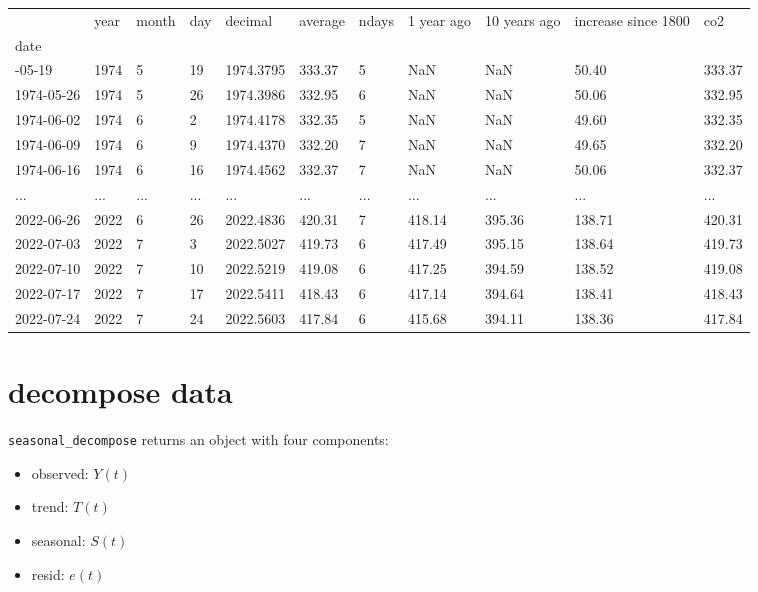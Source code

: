 \documentclass[
  letterpaper,
  DIV=11,
  numbers=noendperiod,
  oneside]{scrreprt}
\providecommand{\tightlist}{%
  \setlength{\itemsep}{0pt}\setlength{\parskip}{0pt}}\usepackage{longtable,booktabs,array}
\begin{document}
\begin{longtable}[]{@{}lllllllllll@{}}
\toprule\noalign{}
& year & month & day & decimal & average & ndays & 1 year ago & 10 years
ago & increase since 1800 & co2 \\
date & & & & & & & & & & \\
\midrule\noalign{}
\endhead
\bottomrule\noalign{}
\endlastfoot
1974-05-19 & 1974 & 5 & 19 & 1974.3795 & 333.37 & 5 & NaN & NaN & 50.40
& 333.37 \\
1974-05-26 & 1974 & 5 & 26 & 1974.3986 & 332.95 & 6 & NaN & NaN & 50.06
& 332.95 \\
1974-06-02 & 1974 & 6 & 2 & 1974.4178 & 332.35 & 5 & NaN & NaN & 49.60 &
332.35 \\
1974-06-09 & 1974 & 6 & 9 & 1974.4370 & 332.20 & 7 & NaN & NaN & 49.65 &
332.20 \\
1974-06-16 & 1974 & 6 & 16 & 1974.4562 & 332.37 & 7 & NaN & NaN & 50.06
& 332.37 \\
... & ... & ... & ... & ... & ... & ... & ... & ... & ... & ... \\
2022-06-26 & 2022 & 6 & 26 & 2022.4836 & 420.31 & 7 & 418.14 & 395.36 &
138.71 & 420.31 \\
2022-07-03 & 2022 & 7 & 3 & 2022.5027 & 419.73 & 6 & 417.49 & 395.15 &
138.64 & 419.73 \\
2022-07-10 & 2022 & 7 & 10 & 2022.5219 & 419.08 & 6 & 417.25 & 394.59 &
138.52 & 419.08 \\
2022-07-17 & 2022 & 7 & 17 & 2022.5411 & 418.43 & 6 & 417.14 & 394.64 &
138.41 & 418.43 \\
2022-07-24 & 2022 & 7 & 24 & 2022.5603 & 417.84 & 6 & 415.68 & 394.11 &
138.36 & 417.84 \\
\end{longtable}

\hypertarget{decompose-data}{%
\section{decompose data}\label{decompose-data}}

\texttt{seasonal\_decompose} returns an object with four components:

\begin{itemize}
\tightlist
\item
  observed: \(Y(t)\)
\item
  trend: \(T(t)\)
\item
  seasonal: \(S(t)\)
\item
  resid: \(e(t)\)
\end{itemize}
\end{document}
